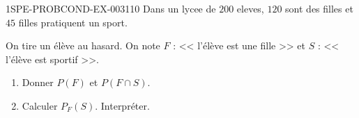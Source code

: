 \begin{exercice}{1SPE-PROBCOND-EX-003}{1}{10}
Dans un lycee de $200$ eleves, $120$ sont des filles et $45$ filles pratiquent un sport.

On tire un élève au hasard. On note $F$ : << l'élève est une fille >> et $S$ : << l'élève est sportif >>.

\begin{enumerate}
  \item Donner $P(F)$ et $P(F \cap S)$.
  \item Calculer $P_F(S)$. Interpréter.
\end{enumerate}
\end{exercice}

